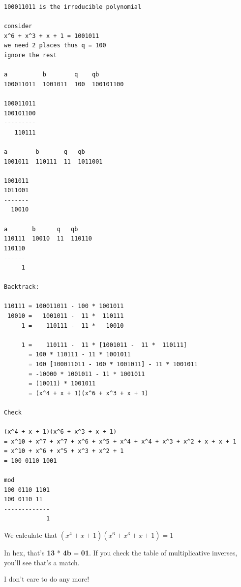 \documentclass[11pt, oneside]{article}
\begin{document}
\begin{verbatim}
100011011 is the irreducible polynomial

consider 
x^6 + x^3 + x + 1 = 1001011
we need 2 places thus q = 100
ignore the rest

a          b        q    qb
100011011  1001011  100  100101100
 
100011011
100101100
---------
   110111

a        b       q   qb
1001011  110111  11  1011001

1001011
1011001
-------
  10010

a       b      q   qb
110111  10010  11  110110
110110
------
     1

Backtrack:

110111 = 100011011 - 100 * 1001011
 10010 =   1001011 -  11 *  110111
     1 =    110111 -  11 *   10010

     1 =    110111 -  11 * [1001011 -  11 *  110111]
       = 100 * 110111 - 11 * 1001011
       = 100 [100011011 - 100 * 1001011] - 11 * 1001011
       = -10000 * 1001011 - 11 * 1001011
       = (10011) * 1001011
       = (x^4 + x + 1)(x^6 + x^3 + x + 1)

Check

(x^4 + x + 1)(x^6 + x^3 + x + 1)
= x^10 + x^7 + x^7 + x^6 + x^5 + x^4 + x^4 + x^3 + x^2 + x + x + 1
= x^10 + x^6 + x^5 + x^3 + x^2 + 1
= 100 0110 1001

mod
100 0110 1101
100 0110 11
-------------
            1
\end{verbatim}
            
We calculate that $(x^4 + x + 1)(x^6 + x^3 + x + 1) = 1$

In hex, that's \textbf{13} * \textbf{4b} = \textbf{01}.  If you check the table of multiplicative inverses, you'll see that's a match.

I don't care to do any more!
\end{document}
